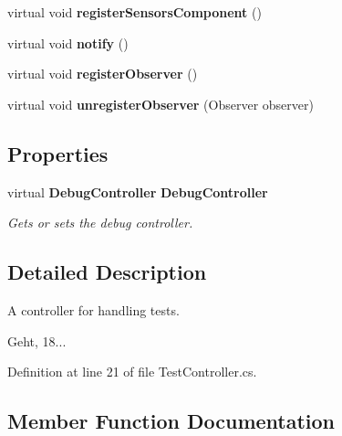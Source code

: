 \begin{DoxyCompactItemize}
\item 
virtual void {\bfseries register\-Sensors\-Component} ()\label{class_player_1_1_controller_1_1_test_controller_1_1_test_controller_ac9c52b1d9a01f4fe428df265888e4722}

\item 
virtual void {\bfseries notify} ()\label{class_player_1_1_controller_1_1_test_controller_1_1_test_controller_a89441363e3ac3c264a89fb7ba2e57ef5}

\item 
virtual void {\bfseries register\-Observer} ()\label{class_player_1_1_controller_1_1_test_controller_1_1_test_controller_a7e6b3e910c94da87e8d566829bc612e0}

\item 
virtual void {\bfseries unregister\-Observer} (Observer observer)\label{class_player_1_1_controller_1_1_test_controller_1_1_test_controller_a83ae1f5f98a70d152d4231f835e1350e}

\end{DoxyCompactItemize}
\subsection*{Properties}
\begin{DoxyCompactItemize}
\item 
virtual {\bf Debug\-Controller} {\bf Debug\-Controller}\hspace{0.3cm}{\ttfamily  [get, set]}
\begin{DoxyCompactList}\small\item\em Gets or sets the debug controller. \end{DoxyCompactList}\end{DoxyCompactItemize}


\subsection{Detailed Description}
A controller for handling tests. 

Geht, 18... 

Definition at line 21 of file Test\-Controller.\-cs.



\subsection{Member Function Documentation}

